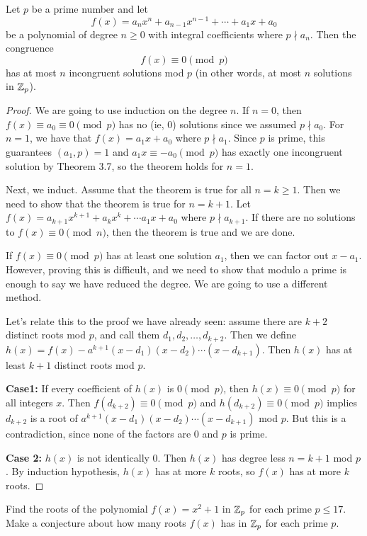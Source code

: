 \documentclass[letterpaper, 11 pt]{article}
\begin{document}
\begin{thm}
Let $p$ be a prime number and let \[f(x)=a_nx^n+a_{n-1}x^{n-1}+\cdots+a_1x+a_0\] be a polynomial of degree $n\geq 0$ with integral coefficients where $p\nmid a_n$.  Then the congruence \[f(x)\equiv 0 \pmod p\] has at most $n$ incongruent solutions mod $p$ (in other words, at most $n$ solutions in $\mathbb Z_p$).
\end{thm}
\begin{proof}
 We are going to use induction on the degree $n$. If $n=0$, then $f(x)\equiv a_0\equiv 0\pmod p$ has no (ie, 0) solutions since we assumed $p\nmid a_0$. For $n=1$, we have that $f(x)=a_1x+a_0$ where $p\nmid a_1$. Since $p$ is prime, this guarantees $(a_1,p)=1$ and $a_1x\equiv -a_0\pmod p$ has exactly one incongruent solution by Theorem 3.7, so the theorem holds for $n=1$.
 
 Next, we induct. Assume that the theorem is true for all $n=k\geq 1$. Then we need to show that the theorem is true for $n=k+1$. Let $f(x)=a_{k+1}x^{k+1}+a_kx^k+\cdots a_1 x+a_0$ where $p\nmid a_{k+1}$. If there are no solutions to $f(x)\equiv 0 \pmod n$, then the theorem is true and we are done. 
 
 If $f(x)\equiv 0 \pmod p$ has at least one solution $a_1$, then we can factor out $x-a_1$. However, proving this is difficult, and we need to show that modulo a prime is enough to say we have reduced the degree. We are going to use a different method.
  
 Let's relate this to the proof we have already seen: assume there are $k+2$ distinct roots mod $p$, and call them $d_1,d_2,\dots,d_{k+2}$. Then we define $h(x)=f(x)-a^{k+1}(x-d_1)(x-d_2)\cdots(x-d_{k+1})$. Then $h(x)$ has at least $k+1$ distinct roots mod $p$. 
 
 {\bf Case1:} If every coefficient of $h(x)$ is  $0 \pmod p$, then $h(x)\equiv 0 \pmod p$ for all integers $x$. Then $f(d_{k+2})\equiv 0 \pmod p$ and $h(d_{k+2})\equiv 0 \pmod p$ implies $d_{k+2}$ is a root of $a^{k+1}(x-d_1)(x-d_2)\cdots(x-d_{k+1})$ mod $p$. But this is a contradiction, since none of the factors are 0 and $p$ is prime. 
 
 {\bf Case 2:} $h(x)$ is not identically 0. Then $h(x)$ has degree less $n=k+1$ mod $p$. By induction hypothesis, $h(x)$ has at more $k$ roots, so $f(x)$ has at more $k$ roots.
\end{proof}

\begin{br}
 Find the roots of the polynomial $f(x) = x^2 +1$ in $\mathbb Z_p$ for each prime $p \leq 17$. Make a conjecture about how many roots $f(x)$ has in $\mathbb Z_p$ for each prime $p.$
\end{br}
\end{document}
